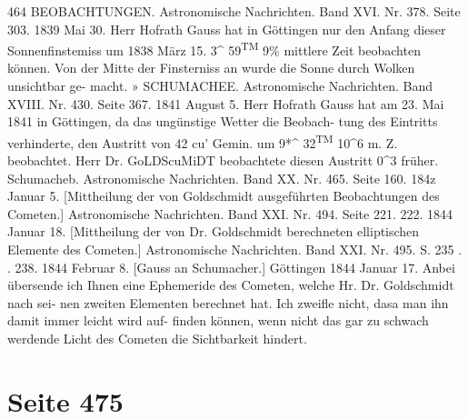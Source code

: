 \documentclass[10pt,a4paper]{article}
\begin{document}
464  BEOBACHTUNGEN.
Astronomische  Nachrichten.     Band  XVI.  Nr.  378.  Seite  303.     1839  Mai  30.
Herr  Hofrath  Gauss  hat  in  Göttingen  nur  den  Anfang  dieser  Sonnenfinstemiss  um
1838  März  15.     3\textasciicircum{}  59\textsuperscript{TM}  9\%  mittlere  Zeit
beobachten  können.     Von  der  Mitte  der  Finsterniss  an  wurde  die  Sonne  durch  Wolken  unsichtbar  ge-
macht. »  SCHUMACHEE.
Astronomische  Nachrichten.     Band  XVIII.  Nr.  430.  Seite  367.     1841  August  5.
Herr  Hofrath  Gauss  hat  am  23.  Mai  1841  in  Göttingen,  da  das  ungünstige  Wetter  die  Beobach-
tung des  Eintritts  verhinderte,  den  Austritt  von  42 cu'  Gemin.  um  9*\textasciicircum{}  32\textsuperscript{TM}  10\textasciicircum{}6  m.  Z.  beobachtet.  Herr
Dr.  GoLDScuMiDT  beobachtete  diesen  Austritt  0\textasciicircum{}3  früher.  Schumacheb.
Astronomische  Nachrichten.     Band  XX.  Nr.  465.  Seite  160.     184z  Januar  5.
[Mittheilung  der  von  Goldschmidt  ausgeführten  Beobachtungen   des  Cometen.]
Astronomische  Nachrichten.     Band  XXI.  Nr.  494.  Seite  221.  222.     1844  Januar  18.
[Mittheilung  der  von  Dr.  Goldschmidt  berechneten  elliptischen  Elemente  des  Cometen.]
Astronomische  Nachrichten.     Band  XXI.  Nr.  495.  S.  235  . .  238.     1844  Februar  8.
[Gauss  an  Schumacher.]     Göttingen  1844  Januar  17.
Anbei  übersende  ich  Ihnen  eine  Ephemeride  des  Cometen,  welche  Hr.  Dr.  Goldschmidt  nach  sei-
nen zweiten  Elementen  berechnet  hat.  Ich  zweifle  nicht,  dasa  man  ihn  damit  immer  leicht  wird  auf-
finden können,  wenn  nicht  das  gar  zu  schwach  werdende  Licht  des  Cometen  die  Sichtbarkeit  hindert.

\newpage
\section*{Seite 475}
\end{document}
